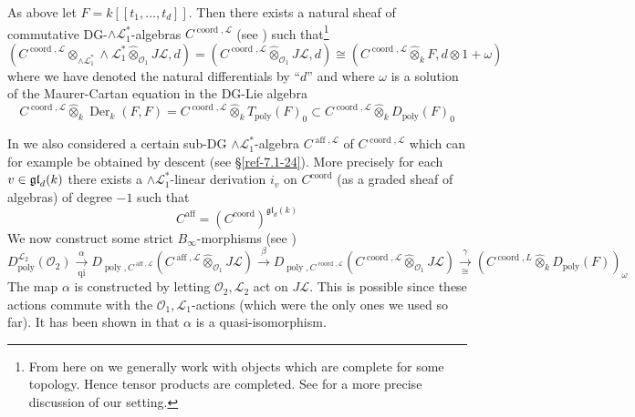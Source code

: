 \documentclass{amsart}
\numberwithin{equation}{section}
\let\cal\mathcal
\theoremstyle{definition}
\theoremstyle{remark}
\begin{document}
As above let $F=k[[t_1,\ldots,t_d]]$. Then there exists a natural sheaf of
commutative DG-$\wedge{{\cal L}}_1^\ast$-algebras $C^{{\operatorname{coord}},{{\cal L}}}$ (see
\cite[\S5.2]{vdbcalaque}) such that\footnote{From here on we generally work
with objects which are complete for some topology. Hence tensor products are
completed. See \cite[\S4.1]{vdbcalaque}
for a more precise discussion of our setting.}
\begin{equation}
\label{ref-10.1-32}
(C^{{\operatorname{coord}},{{\cal L}}}\otimes_{\wedge{{\cal L}}_1^\ast}\wedge{{\cal L}}_1^\ast{\mathbin{\hat{\otimes}}}_{{{\cal O}}_1}
 J{{\cal L}},d)=
(C^{{\operatorname{coord}},{{\cal L}}}{\mathbin{\hat{\otimes}}}_{{{\cal O}}_1} J{{\cal L}},d) \cong (C^{{\operatorname{coord}},{{\cal L}}}{\mathbin{\hat{\otimes}}}_k F,d\otimes 1+\omega)
\end{equation}
where we have denoted the natural differentials by ``$d$'' and where $\omega$
is a solution of the Maurer-Cartan equation in the DG-Lie algebra 
\[
C^{{\operatorname{coord}},{{\cal L}}}{\mathbin{\hat{\otimes}}}_k {\operatorname{Der}}_k(F,F)=
C^{{\operatorname{coord}},{{\cal L}}}{\mathbin{\hat{\otimes}}}_k T_{\operatorname{poly}}(F)_0\subset C^{{\operatorname{coord}},{{\cal L}}}{\mathbin{\hat{\otimes}}}_k D_{\operatorname{poly}}(F)_0
\]

\medskip

In \cite{vdbcalaque} we also considered a certain sub-DG
$\wedge{{\cal L}}^\ast_1$-algebra $C^{{\operatorname{aff}},{{\cal L}}}$ of
$C^{{\operatorname{coord}},{{\cal L}}}$ which can for example be obtained by descent (see \S\ref{ref-7.1-24}). 
 More precisely for each $v\in
\frak{gl}_d(k)$ there exists a $\wedge{{\cal L}}_1^\ast$-linear derivation
$i_v$ on $C^{\operatorname{coord}}$ (as a graded sheaf of algebras) of degree $-1$ such that
\begin{equation}
\label{ref-10.2-33}
C^{\operatorname{aff}}=(C^{\operatorname{coord}})^{\mathfrak{gl}_d(k)}
\end{equation}
We now construct some strict $B_\infty$-morphisms (see \cite{vdbcalaque})
\[
D_{\operatorname{poly}}^{{{\cal L}}_2}({{\cal O}}_2)\xrightarrow[\text{qi}]{\alpha}
D_{{\operatorname{poly}},C^{{\operatorname{aff}},{{\cal L}}}}(C^{{\operatorname{aff}},{{\cal L}}}{\mathbin{\hat{\otimes}}}_{{{\cal O}}_1} J{{\cal L}})
\xrightarrow{\beta}
D_{{\operatorname{poly}},C^{{\operatorname{coord}},{{\cal L}}}}(C^{{\operatorname{coord}},{{\cal L}}}{\mathbin{\hat{\otimes}}}_{{{\cal O}}_1} J{{\cal L}})
\xrightarrow[\cong]{\gamma}
(C^{{\operatorname{coord}},L} {\mathbin{\hat{\otimes}}}_k D_{\operatorname{poly}}(F))_{\omega}
\]
The map $\alpha$ is constructed by letting ${{\cal O}}_2,{{\cal L}}_2$ act on
$J{{\cal L}}$. This is possible since these actions commute with the
${{\cal O}}_1,{{\cal L}}_1$-actions (which were the only ones we used so far).
It has been shown in \cite{vdbcalaque} that $\alpha$ is a quasi-isomorphism.
\end{document}
